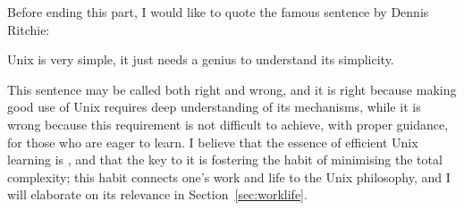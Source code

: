 Before ending this part, I would like to quote
the famous sentence by Dennis Ritchie:\mbox{}
\begin{quoting}
	Unix is very simple, it just needs a genius to understand its simplicity.
\end{quoting}
This sentence may be called both right and wrong, and it is right because
making good use of Unix requires deep understanding of its mechanisms, while
it is wrong because this requirement is not difficult to achieve, with proper
guidance, for those who are eager to learn.  I believe that the essence of
efficient Unix learning is , and that the key to it is fostering the habit of minimising the total
complexity; this habit connects one's work and life to the Unix philosophy,
and I will elaborate on its relevance in Section~\ref{sec:worklife}.

